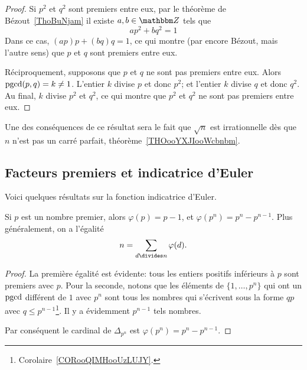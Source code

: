 \begin{proof}
    Si \( p^2\) et \( q^2\) sont premiers entre eux, par le théorème de Bézout~\ref{ThoBuNjam} il existe \( a,b\in \eZ\) tels que
    \begin{equation}
        ap^2+bq^2=1
    \end{equation}
    Dans ce cas, \( (ap)p+(bq)q=1\), ce qui montre (par encore Bézout, mais l'autre sens) que \( p\) et \( q\) sont premiers entre eux.

    Réciproquement, supposons que \( p\) et \( q\) ne sont pas premiers entre eux. Alors \( \operatorname{pgcd}(p,q)=k\neq 1\). L'entier \( k\) divise \( p\) et donc \( p^2\); et l'entier \( k\) divise \( q\) et donc \( q^2\). Au final, \( k\) divise \( p^2\) et \( q^2\), ce qui montre que \( p^2\) et \( q^2\) ne sont pas premiers entre eux.
\end{proof}

Une des conséquences de ce résultat sera le fait que \( \sqrt{n}\) est irrationnelle dès que \( n\) n'est pas un carré parfait, théorème~\ref{THOooYXJIooWcbnbm}.

\subsection{Facteurs premiers et indicatrice d'Euler}
\label{SEC_propIndicatriceEuler}

Voici quelques résultats sur la fonction indicatrice d'Euler.
\begin{proposition}
Si \( p\) est un nombre premier, alors \( \varphi(p)=p-1\), et \( \varphi(p^n)=p^n-p^{n-1}\).  Plus généralement, on a l'égalité
\begin{equation}        \label{EqTPHqgJ}
       n=\sum_{d\divides n}\varphi(d).
\end{equation}
\end{proposition}

\begin{proof}
    La première égalité est évidente: tous les entiers positifs inférieurs à \( p \) sont premiers avec \( p \). Pour la seconde, notons que les éléments de \( \{ 1,\ldots,p^n \}\) qui ont un \( \operatorname{pgcd}\) différent de \( 1\) avec \( p^n\) sont tous les nombres qui s'écrivent sous la forme \( qp\) avec \( q\leq p^{n-1}\)\footnote{Corolaire~\ref{CORooQIMHooUzLUJY}.}. Il y a évidemment \( p^{n-1}\) tels nombres.

    Par conséquent le cardinal de \( \Delta_{p^n}\) est \( \varphi(p^{n})=p^n-p^{n-1}\).
\end{proof}

